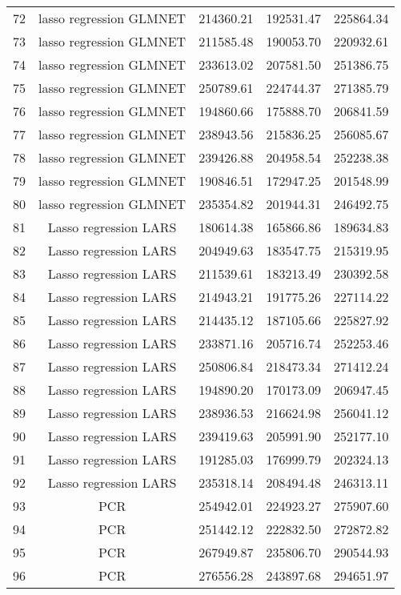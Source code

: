 \begin{tabular}{ccccc}
  72 & lasso regression GLMNET & 214360.21 & 192531.47 & 225864.34 \\ 
  73 & lasso regression GLMNET & 211585.48 & 190053.70 & 220932.61 \\ 
  74 & lasso regression GLMNET & 233613.02 & 207581.50 & 251386.75 \\ 
  75 & lasso regression GLMNET & 250789.61 & 224744.37 & 271385.79 \\ 
  76 & lasso regression GLMNET & 194860.66 & 175888.70 & 206841.59 \\ 
  77 & lasso regression GLMNET & 238943.56 & 215836.25 & 256085.67 \\ 
  78 & lasso regression GLMNET & 239426.88 & 204958.54 & 252238.38 \\ 
  79 & lasso regression GLMNET & 190846.51 & 172947.25 & 201548.99 \\ 
  80 & lasso regression GLMNET & 235354.82 & 201944.31 & 246492.75 \\ 
  81 & Lasso regression LARS & 180614.38 & 165866.86 & 189634.83 \\ 
  82 & Lasso regression LARS & 204949.63 & 183547.75 & 215319.95 \\ 
  83 & Lasso regression LARS & 211539.61 & 183213.49 & 230392.58 \\ 
  84 & Lasso regression LARS & 214943.21 & 191775.26 & 227114.22 \\ 
  85 & Lasso regression LARS & 214435.12 & 187105.66 & 225827.92 \\ 
  86 & Lasso regression LARS & 233871.16 & 205716.74 & 252253.46 \\ 
  87 & Lasso regression LARS & 250806.84 & 218473.34 & 271412.24 \\ 
  88 & Lasso regression LARS & 194890.20 & 170173.09 & 206947.45 \\ 
  89 & Lasso regression LARS & 238936.53 & 216624.98 & 256041.12 \\ 
  90 & Lasso regression LARS & 239419.63 & 205991.90 & 252177.10 \\ 
  91 & Lasso regression LARS & 191285.03 & 176999.79 & 202324.13 \\ 
  92 & Lasso regression LARS & 235318.14 & 208494.48 & 246313.11 \\ 
  93 & PCR & 254942.01 & 224923.27 & 275907.60 \\ 
  94 & PCR & 251442.12 & 222832.50 & 272872.82 \\ 
  95 & PCR & 267949.87 & 235806.70 & 290544.93 \\ 
  96 & PCR & 276556.28 & 243897.68 & 294651.97 \\ 

\end{tabular}

